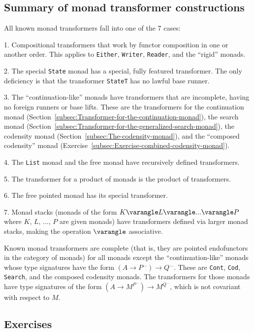 \subsection{Summary of monad transformer constructions\label{subsec:Summary-of-monad-transformer-constructions}}

All known monad transformers fall into one of the 7 cases:

1. Compositional transformers that work by functor composition in
one or another order. This applies to \lstinline!Either!, \lstinline!Writer!,
\lstinline!Reader!, and the \textsf{``}rigid\textsf{''} monads.

2. The special \lstinline!State! monad has a special, fully featured
transformer. The only deficiency is that the transformer \lstinline!StateT!
has no lawful base runner.

3. The \textsf{``}continuation-like\textsf{''} monads have transformers that are incomplete,
having no foreign runners or base lifts. These are the transformers
for the continuation monad (Section~\ref{subsec:Transformer-for-the-continuation-monad}),
the search monad (Section~\ref{subsec:Transformer-for-the-generalized-search-monad}),
the codensity monad (Section~\ref{subsec:The-codensity-monad}),
and the \textsf{``}composed codensity\textsf{''} monad (Exercise~\ref{subsec:Exercise-combined-codensity-monad}).

4. The \lstinline!List! monad and the free monad have recursively
defined transformers.

5. The transformer for a product of monads is the product of transformers.

6. The free pointed monad has its special transformer.

7. Monad stacks (monads of the form $K\varangle L\varangle...\varangle P$
where $K$, $L$, ..., $P$ are given monads) have transformers defined
via larger monad stacks, making the operation $\varangle$ associative. 

Known monad transformers are complete (that is, they are pointed endofunctors
in the category of monads) for all monads except the \textsf{``}continuation-like\textsf{''}
monads whose type signatures have the form $(A\rightarrow P^{...})\rightarrow Q^{...}$.
These are \lstinline!Cont!, \lstinline!Cod!, \lstinline!Search!,
and the composed codensity monads. The transformers for those monads
have type signatures of the form $(A\rightarrow M^{P^{...}})\rightarrow M^{Q^{...}}$,
which is not covariant with respect to $M$.

\subsection{Exercises}

